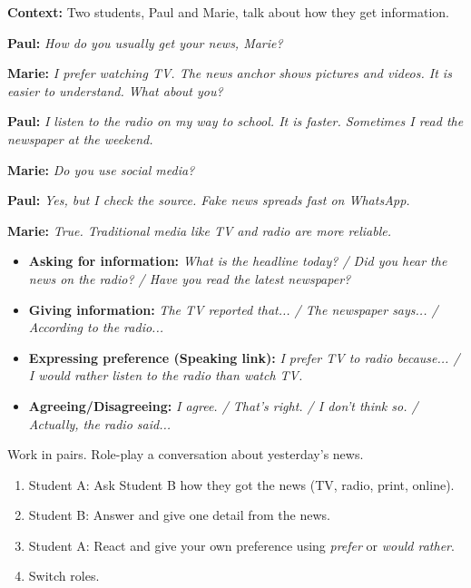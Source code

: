 \documentclass[11pt]{article}
\begin{document}
\begin{exemplebox}
\textbf{Context:} Two students, Paul and Marie, talk about how they get information.

\textbf{Paul:} \emph{How do you usually get your news, Marie?}

\textbf{Marie:} \emph{I prefer watching TV. The news anchor shows pictures and videos. It is easier to understand. What about you?}

\textbf{Paul:} \emph{I listen to the radio on my way to school. It is faster. Sometimes I read the newspaper at the weekend.}

\textbf{Marie:} \emph{Do you use social media?}

\textbf{Paul:} \emph{Yes, but I check the source. Fake news spreads fast on WhatsApp.}

\textbf{Marie:} \emph{True. Traditional media like TV and radio are more reliable.}
\end{exemplebox}

\begin{methode}
\begin{itemize}
\item \textbf{Asking for information:} \emph{What is the headline today? / Did you hear the news on the radio? / Have you read the latest newspaper?}
\item \textbf{Giving information:} \emph{The TV reported that... / The newspaper says... / According to the radio...}
\item \textbf{Expressing preference (Speaking link):} \emph{I prefer TV to radio because... / I would rather listen to the radio than watch TV.}
\item \textbf{Agreeing/Disagreeing:} \emph{I agree. / That's right. / I don't think so. / Actually, the radio said...}
\end{itemize}
\end{methode}

\begin{exercice}
Work in pairs. Role-play a conversation about yesterday's news.
\begin{enumerate}
\item Student A: Ask Student B how they got the news (TV, radio, print, online).
\item Student B: Answer and give one detail from the news.
\item Student A: React and give your own preference using \emph{prefer} or \emph{would rather}.
\item Switch roles.
\end{enumerate}
\end{exercice}
\end{document}
